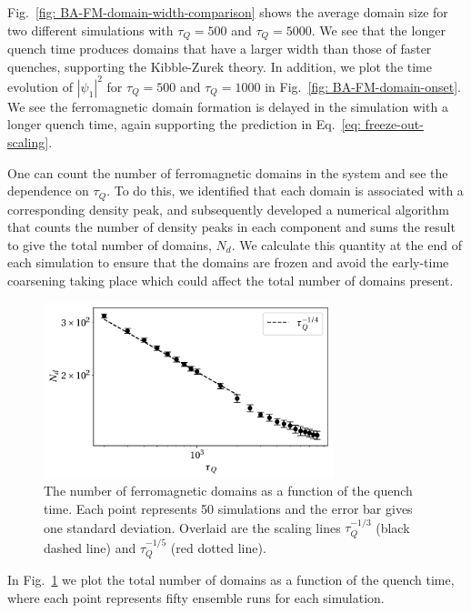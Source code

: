 Fig.~\ref{fig: BA-FM-domain-width-comparison} shows the average domain size
for two different simulations with \(\tau_Q=500\) and \(\tau_Q=5000\).
We see that the longer quench time produces domains that have a
larger width than those of faster quenches, supporting the Kibble-Zurek theory.
In addition, we plot the time evolution of \(|\psi_1|^2\) for \(\tau_Q=500\)
and \(\tau_Q=1000\) in Fig.~\ref{fig: BA-FM-domain-onset}.
We see the ferromagnetic domain formation is delayed in the simulation
with a longer quench time, again supporting the prediction in
Eq.~\eqref{eq: freeze-out-scaling}.

One can count the number of ferromagnetic domains in the system and see the
dependence on \( \tau_Q \).
To do this, we identified that each domain is associated with a corresponding
density peak, and subsequently developed a numerical algorithm that counts the
number of density peaks in each component and sums the result to give the total
number of domains, \(N_d\).
We calculate this quantity at the end of each simulation to ensure that the
domains are frozen and avoid the early-time coarsening taking place which could
affect the total number of domains present.
\begin{figure}[htb!]
    \centering
    \includegraphics[width=0.75\textwidth]{gfx/ch-spin1/FM_domains_scaling.pdf}
    \caption[Total ferromagnetic domains in the system versus the quench rate
        \(\tau_Q\)]
    {The number of ferromagnetic domains as a function of the
        quench time. Each point represents 50 simulations and the
        error bar gives one standard deviation. Overlaid are the scaling lines
        \(\tau_Q^{-1/3}\) (black dashed line) and \(\tau_Q^{-1/5}\)
        (red dotted line).\label{fig: FM-domains-scaling}}
\end{figure}
In Fig.~\ref{fig: FM-domains-scaling} we plot the total number of domains
as a function of the quench time, where each point represents fifty ensemble
runs for each simulation.
